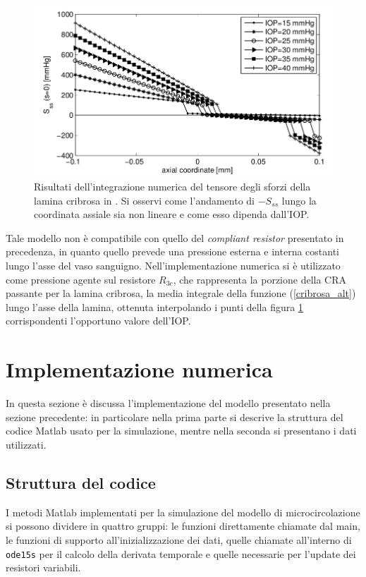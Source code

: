 \documentclass{article}
\begin{document}
\begin{figure}[h]
\begin{center}
\includegraphics[width=1.0\textwidth]{Pictures/riscribrosa.png}
\caption{Risultati dell'integrazione numerica del tensore degli sforzi della lamina cribrosa in \cite{art3}. Si osservi come l'andamento di $-S_{ss}$ lungo la coordinata assiale sia non lineare e come esso dipenda dall'IOP.}
\label{riscribrosa}
\end{center}
\end{figure}

Tale modello non è compatibile con quello del \textit{compliant resistor} presentato in precedenza, in quanto quello prevede una pressione esterna e interna costanti lungo l'asse del vaso sanguigno.
Nell'implementazione numerica si è utilizzato come pressione agente sul resistore $R_{3c}$, che rappresenta la porzione della CRA passante per la lamina cribrosa, la media integrale della funzione (\ref{cribrosa_alt}) lungo l'asse della lamina, ottenuta interpolando i punti della figura \ref{riscribrosa} corrispondenti l'opportuno valore dell'IOP.

\section{Implementazione numerica}
In questa sezione è discussa l'implementazione del modello presentato nella sezione precedente: in particolare nella prima parte si descrive la struttura del codice Matlab usato per la simulazione, mentre nella seconda si presentano i dati utilizzati.
\subsection{Struttura del codice}
I metodi Matlab implementati per la simulazione del modello di microcircolazione si possono dividere in quattro gruppi: le funzioni direttamente chiamate dal main, le funzioni di supporto all'inizializzazione dei dati, quelle chiamate all'interno di \texttt{ode15s} per il calcolo della derivata temporale e quelle necessarie per l'update dei resistori variabili.
\end{document}
